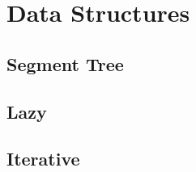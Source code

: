 \documentclass[../Notes/main.tex]{subfiles}
\begin{document}
\section{Data Structures}

\subsection{Segment Tree}

\subsection{Lazy}


\subsection{Iterative}

\end{document}
